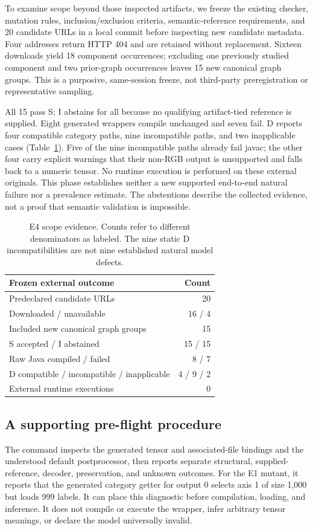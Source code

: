 \documentclass[10pt,twocolumn,letterpaper]{article}
\begin{document}
To examine scope beyond those inspected artifacts, we freeze the existing checker, mutation rules, inclusion/exclusion criteria, semantic-reference requirements, and 20 candidate URLs in a local commit before inspecting new candidate metadata. Four addresses return HTTP 404 and are retained without replacement. Sixteen downloads yield 18 component occurrences; excluding one previously studied component and two prior-graph occurrences leaves 15 new canonical graph groups. This is a purposive, same-session freeze, not third-party preregistration or representative sampling.

All 15 pass S; I abstains for all because no qualifying artifact-tied reference is supplied. Eight generated wrappers compile unchanged and seven fail. D reports four compatible category paths, nine incompatible paths, and two inapplicable cases (Table~\ref{tab:external}). Five of the nine incompatible paths already fail javac; the other four carry explicit warnings that their non-RGB output is unsupported and falls back to a numeric tensor. No runtime execution is performed on these external originals. This phase establishes neither a new supported end-to-end natural failure nor a prevalence estimate. The abstentions describe the collected evidence, not a proof that semantic validation is impossible.

\begin{table}[t]
\centering\small
\begin{tabular}{@{}lr@{}}
\toprule
Frozen external outcome & Count\\
\midrule
Predeclared candidate URLs & 20\\
Downloaded / unavailable & 16 / 4\\
Included new canonical graph groups & 15\\
S accepted / I abstained & 15 / 15\\
Raw Java compiled / failed & 8 / 7\\
D compatible / incompatible / inapplicable & 4 / 9 / 2\\
External runtime executions & 0\\
\bottomrule
\end{tabular}
\caption{E4 scope evidence. Counts refer to different denominators as labeled. The nine static D incompatibilities are not nine established natural model defects.}
\label{tab:external}
\end{table}

\subsection{A supporting pre-flight procedure}
The command inspects the generated tensor and associated-file bindings and the understood default postprocessor, then reports separate structural, supplied-reference, decoder, preservation, and unknown outcomes. For the E1 mutant, it reports that the generated category getter for output 0 selects axis 1 of size 1,000 but loads 999 labels. It can place this diagnostic before compilation, loading, and inference. It does not compile or execute the wrapper, infer arbitrary tensor meanings, or declare the model universally invalid.
\end{document}
